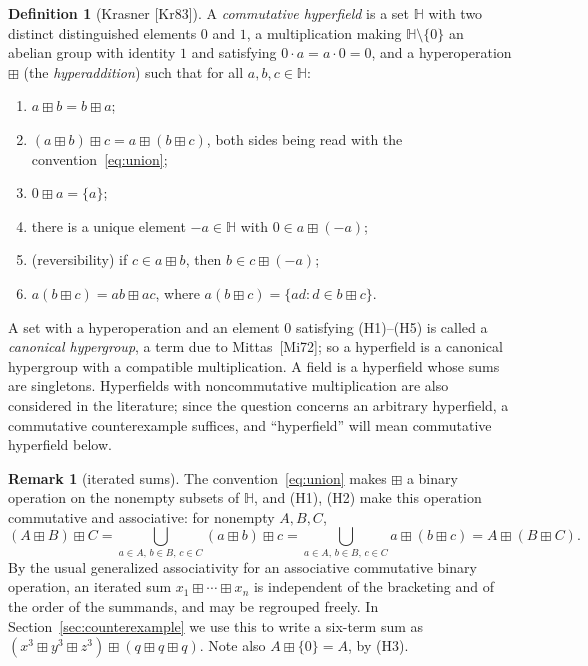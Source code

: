 \documentclass[12pt]{article}
\theoremstyle{plain}
\theoremstyle{definition}
\newtheorem{definition}[theorem]{Definition}
\newtheorem{remark}[theorem]{Remark}
\newcommand{\Hh}{\mathbb{H}}
\newcommand{\bp}{\boxplus}
\begin{document}
\begin{definition}[Krasner {[Kr83]}]\label{def:hyperfield}
A \emph{commutative hyperfield} is a set $\Hh$ with two distinct
distinguished elements $0$ and $1$, a multiplication making
$\Hh\setminus\{0\}$ an abelian group with identity $1$ and satisfying
$0\cdot a=a\cdot 0=0$, and a hyperoperation $\bp$ (the
\emph{hyperaddition}) such that for all $a,b,c\in\Hh$:
\begin{enumerate}
\item[(H1)] $a\bp b=b\bp a$;
\item[(H2)] $(a\bp b)\bp c=a\bp(b\bp c)$, both sides being read with the
convention~\eqref{eq:union};
\item[(H3)] $0\bp a=\{a\}$;
\item[(H4)] there is a unique element $-a\in\Hh$ with $0\in a\bp(-a)$;
\item[(H5)] (reversibility) if $c\in a\bp b$, then $b\in c\bp(-a)$;
\item[(H6)] $a(b\bp c)=ab\bp ac$, where $a(b\bp c)=\{ad:d\in b\bp c\}$.
\end{enumerate}
\end{definition}

A set with a hyperoperation and an element $0$ satisfying (H1)--(H5) is
called a \emph{canonical hypergroup}, a term due to Mittas~[Mi72]; so a
hyperfield is a canonical hypergroup with a compatible multiplication.
A field is a hyperfield whose sums are singletons.  Hyperfields with noncommutative
multiplication are also considered in the literature; since the
question concerns an arbitrary hyperfield, a commutative counterexample
suffices, and ``hyperfield'' will mean commutative hyperfield below.

\begin{remark}[iterated sums]\label{rem:iterated}
The convention~\eqref{eq:union} makes $\bp$ a binary operation on the
nonempty subsets of $\Hh$, and (H1), (H2) make this operation
commutative and associative: for nonempty $A,B,C$,
\[
 (A\bp B)\bp C
 =\bigcup_{a\in A,\,b\in B,\,c\in C}(a\bp b)\bp c
 =\bigcup_{a\in A,\,b\in B,\,c\in C}a\bp(b\bp c)
 =A\bp(B\bp C).
\]
By the usual generalized associativity for an associative commutative
binary operation, an iterated sum $x_1\bp\cdots\bp x_n$ is independent
of the bracketing and of the order of the summands, and may be regrouped
freely.  In Section~\ref{sec:counterexample} we use this to write a
six-term sum as $(x^3\bp y^3\bp z^3)\bp(q\bp q\bp q)$.  Note also
$A\bp\{0\}=A$, by (H3).
\end{remark}
\end{document}
